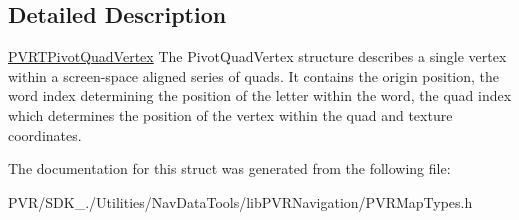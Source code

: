 \subsection{Detailed Description}


  \hyperlink{structpvrnavigation_1_1_p_v_r_t_pivot_quad_vertex}{P\+V\+R\+T\+Pivot\+Quad\+Vertex}  The Pivot\+Quad\+Vertex structure describes a single vertex within a screen-\/space aligned series of quads. It contains the origin position, the word index determining the position of the letter within the word, the quad index which determines the position of the vertex within the quad and texture coordinates. 

The documentation for this struct was generated from the following file\+:\begin{DoxyCompactItemize}
\item 
P\+V\+R/\+S\+D\+K\+\_./\+Utilities/\+Nav\+Data\+Tools/lib\+P\+V\+R\+Navigation/P\+V\+R\+Map\+Types.\+h\end{DoxyCompactItemize}

